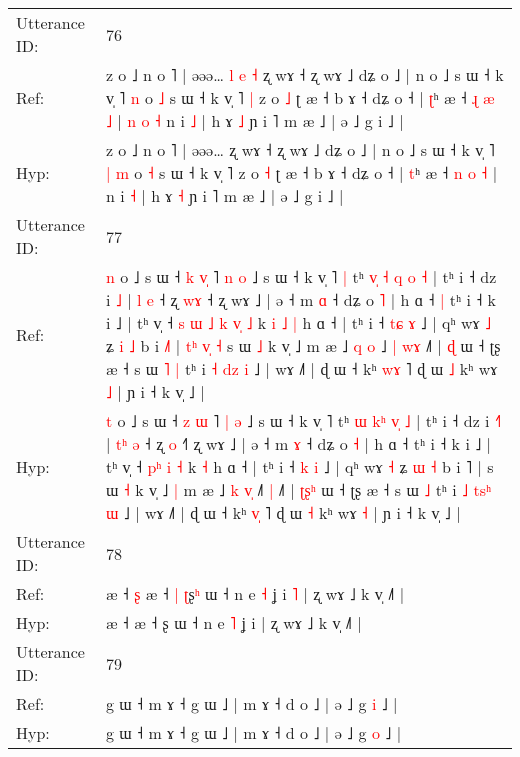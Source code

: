 \documentclass[10pt]{article}
\DeclareRobustCommand{\hl}[1]{{\textcolor{red}{#1}}}
\begin{document}
\begin{longtable}{ll}
 \\
\midrule
Utterance ID: & 76 \\
Ref: & z o ˩ n o ˥ | əəə…\hl{ }\hl{l}\hl{ }\hl{e}\hl{ }\hl{˧} ʐ wɤ ˧ ʐ wɤ ˩ dʑ o ˩ | n o ˩ s ɯ ˧ k v̩ ˥\hl{}\hl{} \hl{n} o \hl{˩} s ɯ ˧ k v̩ ˥\hl{ }\hl{|} z o \hl{˩} ʈ æ ˧ b ɤ ˧ dʑ o ˧ | \hl{ʈ}ʰ æ ˧ \hl{ɻ} \hl{æ} \hl{˩} |\hl{ }\hl{n}\hl{ }\hl{o}\hl{ }\hl{˧} n i \hl{˩} | h ɤ \hl{˩} ɲ i ˥ m æ ˩ | ə ˩ g i ˩ |
 \\
Hyp: & z o ˩ n o ˥ | əəə…\hl{}\hl{}\hl{}\hl{}\hl{}\hl{} ʐ wɤ ˧ ʐ wɤ ˩ dʑ o ˩ | n o ˩ s ɯ ˧ k v̩ ˥\hl{ }\hl{|} \hl{m} o \hl{˧} s ɯ ˧ k v̩ ˥\hl{}\hl{} z o \hl{˧} ʈ æ ˧ b ɤ ˧ dʑ o ˧ | \hl{t}ʰ æ ˧ \hl{n} \hl{o} \hl{˧} |\hl{}\hl{}\hl{}\hl{}\hl{}\hl{} n i \hl{˧} | h ɤ \hl{˧} ɲ i ˥ m æ ˩ | ə ˩ g i ˩ |
 \\
\midrule
Utterance ID: & 77 \\
Ref: & \hl{n} o ˩ s ɯ ˧ \hl{k} \hl{v}\hl{̩} ˥ \hl{n} \hl{o} ˩ s ɯ ˧ k v̩ ˥\hl{ }\hl{|} tʰ \hl{v}\hl{̩} \hl{˧}\hl{ }\hl{q}\hl{ }\hl{o} \hl{˧} | tʰ i ˧ dz i \hl{}\hl{˩} | \hl{}\hl{l} \hl{e} ˧ ʐ \hl{w}\hl{ɤ} ˧\hl{} ʐ wɤ ˩ | ə ˧ m \hl{ɑ} ˧ dʑ o \hl{˥} | h ɑ ˧\hl{ }\hl{|} tʰ i ˧ k i ˩ | tʰ v̩ ˧\hl{ }\hl{s}\hl{ }\hl{ɯ} \hl{˩}\hl{ }\hl{k} \hl{v}\hl{̩} \hl{˩} k\hl{ }\hl{i}\hl{ }\hl{˩} \hl{|} h ɑ ˧ | tʰ i ˧ \hl{t}\hl{ɕ} \hl{ɤ} ˩ | qʰ wɤ \hl{˩} ʑ \hl{i} \hl{˩} b i \hl{˩}˥ |\hl{ }\hl{t}\hl{ʰ}\hl{ }\hl{v}\hl{̩}\hl{ }\hl{˧} s ɯ \hl{˩} k v̩ ˩\hl{}\hl{} m æ ˩ \hl{q} \hl{}\hl{o} ˩\hl{ }\hl{|} \hl{w}\hl{ɤ} ˩˥ | \hl{}\hl{}\hl{ɖ} ɯ ˧ ʈʂ æ ˧ s ɯ\hl{ }\hl{˥} \hl{|} tʰ i \hl{˧} \hl{}\hl{d}\hl{z} \hl{i} ˩ | wɤ ˩˥ | ɖ ɯ ˧ kʰ \hl{w}\hl{ɤ} ˥ ɖ ɯ \hl{˩} kʰ wɤ \hl{˩} | ɲ i ˧ k v̩ ˩ |
 \\
Hyp: & \hl{t} o ˩ s ɯ ˧ \hl{z} \hl{}\hl{ɯ} ˥ \hl{|} \hl{ə} ˩ s ɯ ˧ k v̩ ˥\hl{}\hl{} tʰ \hl{}\hl{ɯ} \hl{k}\hl{ʰ}\hl{ }\hl{v}\hl{̩} \hl{˩} | tʰ i ˧ dz i \hl{˧}\hl{˥} | \hl{t}\hl{ʰ} \hl{ə} ˧ ʐ \hl{}\hl{o} ˧\hl{˥} ʐ wɤ ˩ | ə ˧ m \hl{ɤ} ˧ dʑ o \hl{˧} | h ɑ ˧\hl{}\hl{} tʰ i ˧ k i ˩ | tʰ v̩ ˧\hl{}\hl{}\hl{}\hl{} \hl{}\hl{p}\hl{ʰ} \hl{}\hl{i} \hl{˧} k\hl{}\hl{}\hl{}\hl{} \hl{˧} h ɑ ˧ | tʰ i ˧ \hl{}\hl{k} \hl{i} ˩ | qʰ wɤ \hl{˧} ʑ \hl{ɯ} \hl{˧} b i \hl{}˥ |\hl{}\hl{}\hl{}\hl{}\hl{}\hl{}\hl{}\hl{} s ɯ \hl{˧} k v̩ ˩\hl{ }\hl{|} m æ ˩ \hl{k} \hl{v}\hl{̩} ˩\hl{}\hl{˥} \hl{}\hl{|} ˩˥ | \hl{ʈ}\hl{ʂ}\hl{ʰ} ɯ ˧ ʈʂ æ ˧ s ɯ\hl{}\hl{} \hl{˩} tʰ i \hl{˩} \hl{t}\hl{s}\hl{ʰ} \hl{ɯ} ˩ | wɤ ˩˥ | ɖ ɯ ˧ kʰ \hl{v}\hl{̩} ˥ ɖ ɯ \hl{˧} kʰ wɤ \hl{˧} | ɲ i ˧ k v̩ ˩ |
 \\
\midrule
Utterance ID: & 78 \\
Ref: & æ ˧\hl{ }\hl{ʂ} æ ˧\hl{ }\hl{|} \hl{ʈ}ʂ\hl{ʰ} ɯ ˧ n e \hl{˧} ʝ i\hl{ }\hl{˥} | ʐ wɤ ˩ k v̩ ˩˥ |
 \\
Hyp: & æ ˧\hl{}\hl{} æ ˧\hl{}\hl{} \hl{}ʂ\hl{} ɯ ˧ n e \hl{˥} ʝ i\hl{}\hl{} | ʐ wɤ ˩ k v̩ ˩˥ |
 \\
\midrule
Utterance ID: & 79 \\
Ref: & g ɯ ˧ m ɤ ˧ g ɯ ˩ | m ɤ ˧ d o ˩ | ə ˩ g \hl{i} ˩ |
 \\
Hyp: & g ɯ ˧ m ɤ ˧ g ɯ ˩ | m ɤ ˧ d o ˩ | ə ˩ g \hl{o} ˩ |
 \\
\midrule
\end{longtable}
\end{document}
